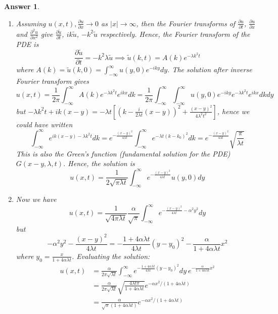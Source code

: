 \documentclass[a4paper]{article}
\newtheorem{ans}{Answer}[section]
\theoremstyle{new}
\begin{document}
\begin{ans}
\begin{enumerate}[label=(\alph*)]
\begin{center}
  \end{center}
 The contributions along $\gamma_R^\pm$ is
 $$\int_{\pm R}^{\pm R+\text{Im}[a]}e^{-R^2-2iy+y^2}dy=O(e^{-R^2})\rightarrow 0,\text{ as }R\rightarrow\infty$$
 Let $u=R+iy$, then 
 $$\int_{-\infty}^{\infty+\text{Im}[a]}e^{-z^2}dz=\int_{-\infty}^\infty e^{-(u+i\text{Im}[a])^2}du=\int_{-\infty}^\infty e^{-(u+a)^2}du$$
 The contributions along $\gamma_0$ gives
 $$\int_{-R}^Re^{-x^2}dx\rightarrow\sqrt{\pi},\text{ as }R\rightarrow\infty$$
 Hence, by residue theorem, we must have
 $$\int_{-\infty}^\infty e^{-(u+a)^2}du=\sqrt{\pi}$$
\item Assuming $u(x,t),\frac{\partial u}{\partial x}\rightarrow0$ as $|x|\rightarrow\infty$, then the Fourier transforms of $\frac{\partial u}{\partial t}$, $\frac{\partial u}{\partial x}$ and $\frac{\partial^2u}{\partial x^2}$ give $\frac{\partial\tilde{u}}{\partial t}$, $ik\tilde{u}$, $-k^2\tilde{u}$ respectively. Hence, the Fourier transform of the PDE is
$$\frac{\partial\tilde{u}}{\partial t}=-k^2\lambda\tilde{u}\implies\tilde{u}(k,t)=A(k)e^{-\lambda k^2t}$$
where $A(k)=\tilde{u}(k,0)=\int_{-\infty}^\infty u(y,0)e^{-iky}dy$. The solution after inverse Fourier transform gives
$$u(x,t)=\frac{1}{2\pi}\int_{-\infty}^\infty A(k)e^{-\lambda k^2t}e^{ikx}dk=\frac{1}{2\pi}\int_{-\infty}^\infty\int_{-\infty}^\infty u(y,0)e^{-iky}e^{-\lambda k^2t}e^{ikx}dkdy$$
but $-\lambda k^2t+ik(x-y)=-\lambda t[(k-\frac{i}{2\lambda t}(x-y))^2+\frac{(x-y)^2}{4\lambda^2t^2}]$, hence we could have written
$$\int_{-\infty}^\infty e^{ik(x-y)-\lambda k^2t}dk=e^{-\frac{(x-y)^2}{4\lambda t}}\int_{-\infty}^\infty e^{-\lambda t(k-k_0)^2}dk=e^{-\frac{(x-y)^2}{4\lambda t}}\sqrt{\frac{\pi}{\lambda t}}$$
This is also the Green's function (fundamental solution for the PDE) $G(x-y,\lambda,t)$. Hence, the solution is
$$u(x,t)=\frac{1}{2\sqrt{\pi\lambda t}}\int_{-\infty}^\infty e^{-\frac{(x-y)^2}{4\lambda t}}u(y,0)dy$$
\item Now we have
$$u(x,t)=\frac{1}{\sqrt{4\pi\lambda t}}\frac{\alpha}{\sqrt{\pi}}\int_{-\infty}^\infty e^{-\frac{(x-y)^2}{4\lambda t}-\alpha^2y^2}dy$$
but 
$$-\alpha^2y^2-\frac{(x-y)^2}{4\lambda t}=-\frac{1+4\alpha\lambda t}{4\lambda t}(y-y_0)^2-\frac{\alpha}{1+4\alpha\lambda t}x^2$$
where $y_0=\frac{x}{1+4\alpha\lambda t}$. Evaluating the solution:
\begin{align}
    u(x,t)&=\frac{\alpha}{2\pi\sqrt{\lambda t}}\int_{-\infty}^\infty e^{-\frac{1+4\alpha\lambda t}{4\lambda t}(y-y_0)^2}dy~ e^{-\frac{\alpha}{1+4\alpha\lambda t}x^2}\nonumber\\&=\frac{\alpha}{2\pi\sqrt{\lambda t}}\sqrt{\frac{4\lambda t\pi}{1+4\alpha\lambda t}}e^{-\alpha x^2/(1+4\alpha\lambda t)}\nonumber\\&=\frac{\alpha}{\sqrt{\pi}(1+4\alpha\lambda t)}e^{-\alpha x^2/(1+4\alpha\lambda t)}\nonumber

\end{align}
\end{enumerate}
\end{ans}
\end{document}
